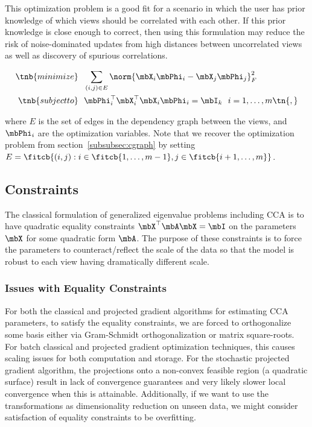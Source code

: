 \documentclass{article}
\begin{document}
	This optimization problem is a good fit for a scenario in which the user has prior knowledge of which views should be correlated with each other. If this prior knowledge is close enough to correct, then using this formulation may reduce the risk of noise-dominated updates from high distances between uncorrelated views as well as discovery of spurious correlations.
	
	\begin{align*}
		\tnb{minimize}&\ \ \sum_{(i,j) \in E}\norm{\mbX_i \mbPhi_i - \mbX_j \mbPhi_j}_F^2\\
		\tnb{subject to}&\ \  \mbPhi_i^{\top}\mbX_i^{\top}\mbX_i\mbPhi_i = \mbI_k\ \ i=1,\ldots,m \tn{,}
	\end{align*}
	
	\noindent where $E$ is the set of edges in the dependency graph between the views, and $\mbPhi_i$ are the optimization variables. Note that we recover the optimization problem from section~\ref{subsubsec:cgraph} by setting $E = \fitcb{(i,j) : i \in \fitcb{1,\ldots,m-1}, j \in \fitcb{i+1, \ldots, m}}$.
	
	\subsection{Constraints} \label{subsec:constraints}
	The classical formulation of generalized eigenvalue problems including CCA is to have quadratic equality constraints $\mbX^{\top}\mbA\mbX = \mbI$ on the parameters $\mbX$ for some quadratic form $\mbA$. The purpose of these constraints is to force the parameters to counteract/reflect the scale of the data so that the model is robust to each view having dramatically different scale.
	
	\subsubsection{Issues with Equality Constraints} \label{subsubsec:issueswithequality}
	For both the classical and projected gradient algorithms for estimating CCA parameters, to satisfy the equality constraints, we are forced to orthogonalize some basis either via Gram-Schmidt orthogonalization or matrix square-roots. For batch classical and projected gradient optimization techniques, this causes scaling issues for both computation and storage. For the stochastic projected gradient algorithm, the projections onto a non-convex feasible region (a quadratic surface) result in lack of convergence guarantees and very likely slower local convergence when this is attainable. Additionally, if we want to use the transformations as dimensionality reduction on unseen data, we might consider satisfaction of equality constraints to be overfitting.
	
\end{document}
